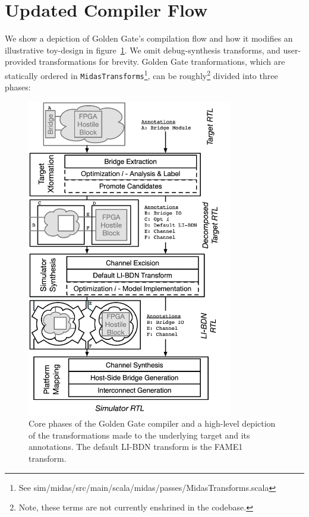 \section{Updated Compiler Flow}

We show a depiction of Golden Gate's compilation flow and how it modifies an
illustrative toy-design in figure~\ref{fig:gg-toolchain}.  We omit
debug-synthesis transforms, and user-provided transformations for brevity.
Golden Gate tranformations, which are statically ordered in
\texttt{MidasTransforms}\footnote{See sim/midas/src/main/scala/midas/passes/MidasTransforms.scala}, can be
roughly\footnote{Note, these terms are not currently enshrined in the
codebase.} divided into three phases:

\begin{figure}
    \centering
    \includegraphics[width=0.8\textwidth]{figures/gg-toolchain.pdf}
    \caption{Core phases of the Golden Gate compiler and a high-level depiction
    of the transformations made to the underlying target and its annotations. The default LI-BDN transform
    is the FAME1 transform.}
    \label{fig:gg-toolchain}
\end{figure}

